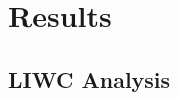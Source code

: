 \documentclass{acm_proc_article-sp}
\begin{document}
%

%
%
%
%
\section{Results}
\subsection{LIWC Analysis}
\end{document}

